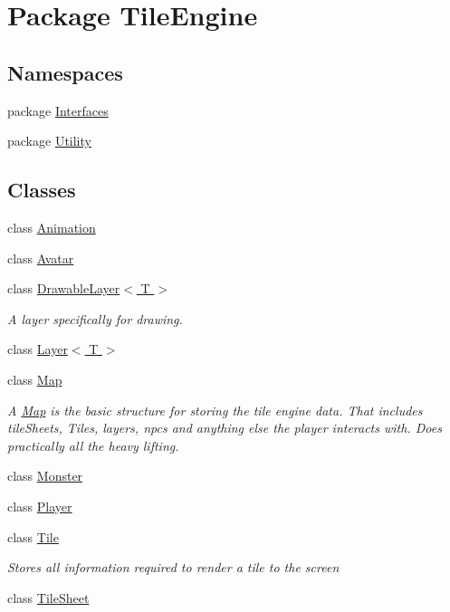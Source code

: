 \hypertarget{namespace_tile_engine}{\section{Package Tile\-Engine}
\label{namespace_tile_engine}
}
\subsection*{Namespaces}
\begin{DoxyCompactItemize}
\item 
package \hyperlink{namespace_tile_engine_1_1_interfaces}{Interfaces}
\item 
package \hyperlink{namespace_tile_engine_1_1_utility}{Utility}
\end{DoxyCompactItemize}
\subsection*{Classes}
\begin{DoxyCompactItemize}
\item 
class \hyperlink{class_tile_engine_1_1_animation}{Animation}
\item 
class \hyperlink{class_tile_engine_1_1_avatar}{Avatar}
\item 
class \hyperlink{class_tile_engine_1_1_drawable_layer_3_01_t_01_4}{Drawable\-Layer$<$ T $>$}
\begin{DoxyCompactList}\small\item\em A layer specifically for drawing. \end{DoxyCompactList}\item 
class \hyperlink{class_tile_engine_1_1_layer_3_01_t_01_4}{Layer$<$ T $>$}
\item 
class \hyperlink{class_tile_engine_1_1_map}{Map}
\begin{DoxyCompactList}\small\item\em A \hyperlink{class_tile_engine_1_1_map}{Map} is the basic structure for storing the tile engine data. That includes tile\-Sheets, Tiles, layers, npcs and anything else the player interacts with. Does practically all the heavy lifting. \end{DoxyCompactList}\item 
class \hyperlink{class_tile_engine_1_1_monster}{Monster}
\item 
class \hyperlink{class_tile_engine_1_1_player}{Player}
\item 
class \hyperlink{class_tile_engine_1_1_tile}{Tile}
\begin{DoxyCompactList}\small\item\em Stores all information required to render a tile to the screen \end{DoxyCompactList}\item 
class \hyperlink{class_tile_engine_1_1_tile_sheet}{Tile\-Sheet}
\end{DoxyCompactItemize}
